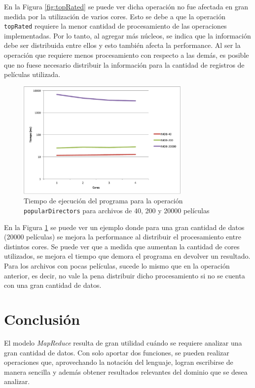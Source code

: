 \documentclass[a4paper,11pt]{article}
\begin{document}
En la Figura \ref{fig:topRated} se puede ver dicha operación no fue afectada en gran medida por la utilización de varios cores. Esto se debe a que la operación \texttt{topRated} requiere la menor cantidad de procesamiento de las operaciones implementadas. Por lo tanto, al agregar más núcleos, se indica que la información debe ser distribuida entre ellos y esto también afecta la performance. Al ser la operación que requiere menos procesamiento con respecto a las demás, es posible que no fuese necesario distribuir la información para la cantidad de registros de películas utilizada.

\begin{figure}[H]
    \centering
    \includegraphics[width=0.75\textwidth]{images/popularDir.pdf}
    \caption{Tiempo de ejecución del programa para la operación \texttt{popularDirectors} para archivos de 40, 200 y 20000 películas}
    \label{fig:popDir}
\end{figure}

En la Figura \ref{fig:popDir} se puede ver un ejemplo donde para una gran cantidad de datos (20000 películas) se mejora la performance al distribuir el procesamiento entre distintos cores. Se puede ver que a medida que aumentan la cantidad de cores utilizados, se mejora el tiempo que demora el programa en devolver un resultado. Para los archivos con pocas películas, sucede lo mismo que en la operación anterior, es decir, no vale la pena distribuir dicho procesamiento si no se cuenta con una gran cantidad de datos.

\section{Conclusión}

El modelo \textit{MapReduce} resulta de gran utilidad cuándo se requiere analizar una gran cantidad de datos. Con solo aportar dos funciones, se pueden realizar operaciones que, aprovechando la notación del lenguaje, logran escribirse de manera sencilla y además obtener resultados relevantes del dominio que se desea analizar.
\end{document}

